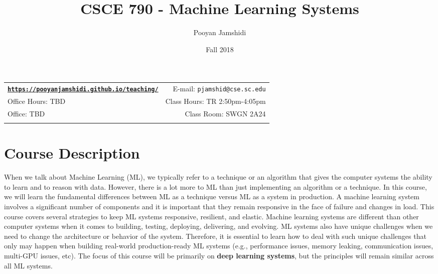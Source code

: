 \documentclass[11pt]{article}
\title{CSCE 790 - Machine Learning Systems}
\author{Pooyan Jamshidi}
\date{Fall 2018}
\newcommand{\blankline}{\quad\pagebreak[2]}
\begin{document}
\maketitle

\blankline

\begin{tabular*}{.93\textwidth}{@{\extracolsep{\fill}}lr}


\href{https://pooyanjamshidi.github.io/teaching/}{\tt\bf https://pooyanjamshidi.github.io/teaching/}  & E-mail: \texttt{pjamshid@cse.sc.edu} \\

 Office Hours: TBD  &  Class Hours: TR 2:50pm-4:05pm \\


 Office: TBD & Class Room: SWGN 2A24 \\
&  \\

\hline
\end{tabular*}

\vspace{10mm}

\section*{Course Description}

When we talk about Machine Learning (ML), we typically refer to a technique or an algorithm that gives the computer systems the ability to learn and to reason with data. However, there is a lot more to ML than just implementing an algorithm or a technique. In this course, we will learn the fundamental differences between ML as a technique versus ML as a system in production. A machine learning system involves a significant number of components and it is important that they remain responsive in the face of failure and changes in load. This course covers several strategies to keep ML systems responsive, resilient, and elastic. Machine learning systems are different than other computer systems when it comes to building, testing, deploying, delivering, and evolving. ML systems also have unique challenges when we need to change the architecture or behavior of the system. Therefore, it is essential to learn how to deal with such unique challenges that only may happen when building real-world production-ready ML systems (e.g., performance issues, memory leaking, communication issues, multi-GPU issues, etc). The focus of this course will be primarily on \textbf{deep learning systems}, but the principles will remain similar across all ML systems. 
\end{document}

